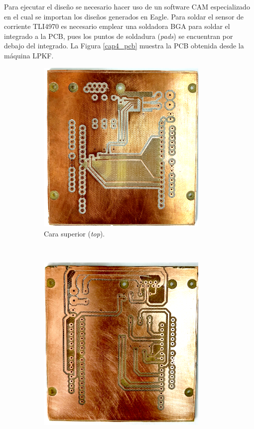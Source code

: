 Para ejecutar el diseño se necesario hacer uso de un software CAM especializado en el cual se importan los diseños generados en Eagle\textregistered.  Para soldar el sensor de corriente TLI4970 es necesario emplear una soldadora BGA para soldar el integrado a la PCB, pues los puntos de soldadura (\textit{pads}) se encuentran por debajo del integrado. La Figura \ref{cap4_pcb} muestra la PCB obtenida desde la máquina LPKF\textregistered.


\begin{figure}[H]
  \centering
  \begin{subfigure}[b]{0.35\textwidth}
    \includegraphics[width=0.9\textwidth]{img/cap4/top_pcb}
    \caption{Cara superior (\textit{top}).}
    \label{cap4_top_pcb}
  \end{subfigure}%
  ~
  \begin{subfigure}[b]{0.35\textwidth}
    \includegraphics[width=0.9\textwidth]{img/cap4/bottom_pcb}

\end{subfigure}
\end{figure}
